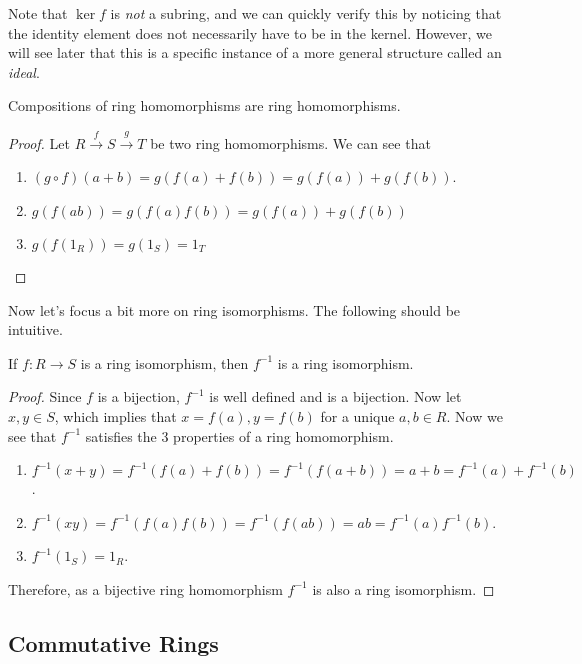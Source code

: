   Note that $\ker{f}$ is \textit{not} a subring, and we can quickly verify this by noticing that the identity element does not necessarily have to be in the kernel. However, we will see later that this is a specific instance of a more general structure called an \textit{ideal}. 

  \begin{theorem}
    Compositions of ring homomorphisms are ring homomorphisms. 
  \end{theorem} 
  \begin{proof}
    Let $R \xrightarrow{f} S \xrightarrow{g} T$ be two ring homomorphisms. We can see that 
    \begin{enumerate}
      \item $(g \circ f)(a + b) = g( f(a) + f(b)) = g(f(a)) + g(f(b))$. 
      \item $g(f(ab)) = g(f(a) f(b)) = g(f(a)) + g(f(b))$ 
      \item $g(f(1_R)) = g(1_S) = 1_T$
    \end{enumerate}
  \end{proof}

  Now let's focus a bit more on ring isomorphisms. The following should be intuitive. 

  \begin{lemma}
    If $f: R \to S$ is a ring isomorphism, then $f^{-1}$ is a ring isomorphism. 
  \end{lemma} 
  \begin{proof}
    Since $f$ is a bijection, $f^{-1}$ is well defined and is a bijection. Now let $x, y \in S$, which implies that $x = f(a), y = f(b)$ for a unique $a, b \in R$. Now we see that $f^{-1}$ satisfies the 3 properties of a ring homomorphism. 
    \begin{enumerate}
      \item $f^{-1} (x + y) = f^{-1} (f(a) + f(b)) = f^{-1}(f(a + b)) = a + b = f^{-1}(a) + f^{-1} (b)$. 
      \item $f^{-1} (x y) = f^{-1} (f(a) f(b)) = f^{-1}(f(a b)) = a b = f^{-1}(a) f^{-1} (b)$. 
      \item $f^{-1}(1_S) = 1_R$. 
    \end{enumerate}
    Therefore, as a bijective ring homomorphism $f^{-1}$ is also a ring isomorphism. 
  \end{proof}

\subsection{Commutative Rings} 

